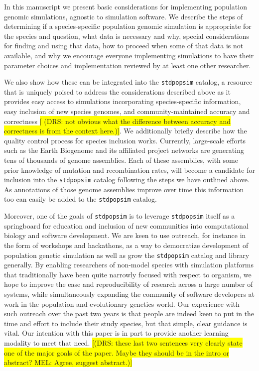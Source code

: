 \documentclass[hidelinks]{article}
\newcommand{\stdpopsim}{\texttt{stdpopsim}\xspace}
\begin{document}
In this manuscript we present basic considerations for implementing
population genomic simulations, agnostic to simulation software. We
describe the steps of determining if a species-specific population
genomic simulation is appropriate for the species and question, what
data is necessary and why, special considerations for finding and using
that data, how to proceed when some of that data is not available,
and why we encourage everyone implementing simulations to have their
parameter choices and implementation reviewed by at least one other
researcher.

We also show how these can be integrated into the \stdpopsim catalog, a
resource that is uniquely poised to address the considerations described above as it provides easy
access to simulations incorporating species-specific information,
easy inclusion of new species genomes, and community-maintained accuracy
and correctness \colorbox{yellow}{[ (DRS: not obvious what the difference between accuracy
and correctness is from the context here.)]}.
We additionally briefly describe how the quality control
process for species inclusion works. Currently, large-scale efforts such as the Earth Biogenome
and its affiliated project networks are generating tens of thousands of genome
assemblies. Each of these assemblies, with some prior knowledge of mutation and
recombination rates, will become a candidate for inclusion into the
\stdpopsim catalog following the steps we have outlined above. As
annotations of those genome assemblies improve over time this information too can easily
be added to the \stdpopsim catalog.

Moreover, one of the goals of \stdpopsim is to leverage \stdpopsim itself
as a springboard for education and inclusion of new communities into
computational biology and software development. We are keen to use
outreach, for instance in the form of workshops and hackathons, as a way
to democratize development of population genetic simulation as well as
grow the \stdpopsim catalog and library generally. By enabling
researchers of non-model species with simulation platforms that
traditionally have been quite narrowly focused with respect to organism,
we hope to improve the ease and reproducibility of research across a large number of
systems, while simultaneously expanding the community of software
developers at work in the population and evolutionary genetics world.
Our experience with such outreach over the past two years is that people
are indeed keen to put in the time and effort to include their
study species, but that simple, clear guidance is vital. Our
intention with this paper is in part to provide another learning
modality to meet that need. \colorbox{yellow}{[(DRS: these last two sentences very
clearly state one of the major goals of the paper. Maybe they should be
in the intro or abstract? MEL: Agree, suggest abstract.)]}
\end{document}
